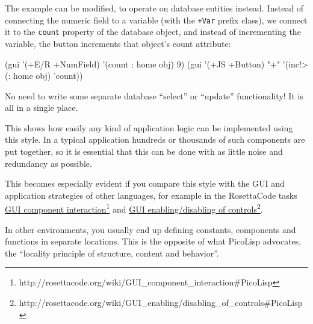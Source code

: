 The example can be modified, to operate on database entities instead. Instead of
connecting the numeric field to a variable (with the \texttt{+Var} prefix class), we
connect it to the \texttt{count} property of the database object, and instead of
incrementing the variable, the button increments that object's count attribute:
\begin{wideverbatim}
   (gui '(+E/R +NumField) '(count : home obj) 9)
   (gui '(+JS +Button) "+" '(inc!> (: home obj) 'count))
\end{wideverbatim}

No need to write some separate database ``select'' or ``update'' functionality! It
is all in a single place.

This shows how easily any kind of application logic can be implemented using
this style. In a typical application hundreds or thousands of such components
are put together, so it is essential that this can be done with as little noise
and redundancy as possible.

This becomes especially evident if you compare this style with the GUI and
application strategies of other languages, for example in the RosettaCode
tasks
\underline{GUI component interaction}\footnote{http://rosettacode.org/wiki/GUI\_component\_interaction\#PicoLisp}
and
\underline{GUI enabling/disabling of controls}\footnote{http://rosettacode.org/wiki/GUI\_enabling/disabling\_of\_controls\#PicoLisp}.

In other environments, you usually end up defining constants, components and
functions in separate locations. This is the opposite of what PicoLisp
advocates, the ``locality principle of structure, content and behavior''.


